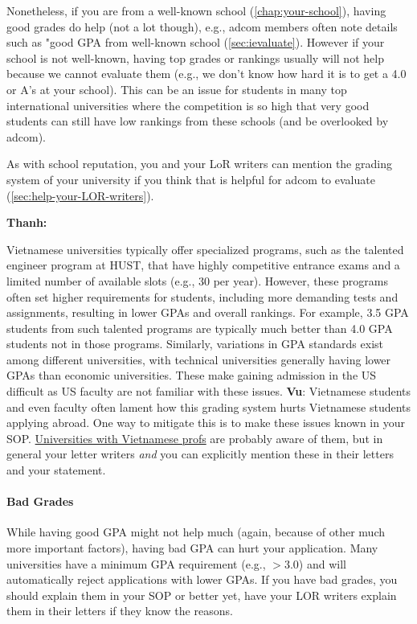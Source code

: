 \documentclass[oneside,11pt,dvipsnames]{book}
\newenvironment{commentbox}[1][]{
  \small
  \begin{mybox}
    {\small \textbf{#1}}
  }{
  \end{mybox}
}
\begin{document}
Nonetheless, if you are from a well-known school (\autoref{chap:your-school}), having good grades do help (not a lot though), e.g., adcom members often note details such as "good GPA from well-known school (\autoref{sec:ievaluate}). However if your school is not well-known, having top grades or rankings usually will not help because we cannot evaluate them (e.g., we don't know how hard it is to get a 4.0 or A's at your school). This can be an issue for students in many top international universities where the competition is so high that very good students can still have low rankings from these schools (and be overlooked by adcom).

As with school reputation, you and your LoR writers can mention the grading system of your university if you think that is helpful for adcom to evaluate (\autoref{sec:help-your-LOR-writers}).


\begin{commentbox}[Thanh:]
    Vietnamese universities typically offer specialized programs, such as the talented engineer program at HUST, that have highly competitive entrance exams and a limited number of available slots (e.g., 30 per year). However, these programs often set higher requirements for students, including more demanding tests and assignments, resulting in lower GPAs and overall rankings. For example, 3.5 GPA students from such talented programs are typically much better than 4.0 GPA students not in those programs.  Similarly, variations in GPA standards exist among different universities, with technical universities generally having lower GPAs than economic universities. These make gaining admission in the US difficult as US faculty are not familiar with these issues.
    \tcblower
    \textbf{Vu}: Vietnamese students and even faculty often lament how this grading system hurts Vietnamese students applying abroad. One way to mitigate this is to make these issues known in your SOP.  \href{https://github.com/dynaroars/dynaroars.github.io/wiki/Viet-CS-Profs-US}{Universities with Vietnamese profs} are probably aware of them, but in general your letter writers \emph{and} you can explicitly mention these in their letters and your statement.
  \end{commentbox}

  
\paragraph{Bad Grades} 
While having good GPA might not help much (again, because of other much more important factors),
having bad GPA can hurt your application.  Many universities have a minimum GPA requirement (e.g., $> 3.0$) and will automatically reject applications with lower GPAs.  
If you have bad grades, you should explain them in your SOP or better yet, have your LOR writers explain them in their letters if they know the reasons.
\end{document}
